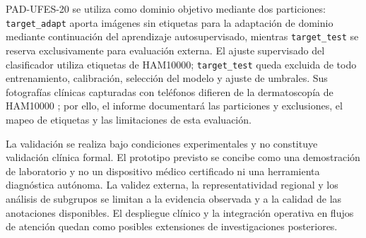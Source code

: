 PAD-UFES-20 se utiliza como dominio objetivo mediante dos particiones: \texttt{target\_adapt} aporta imágenes sin etiquetas para la adaptación de dominio mediante continuación del aprendizaje autosupervisado, mientras \texttt{target\_test} se reserva exclusivamente para evaluación externa. El ajuste supervisado del clasificador utiliza etiquetas de HAM10000; \texttt{target\_test} queda excluida de todo entrenamiento, calibración, selección del modelo y ajuste de umbrales. Sus fotografías clínicas capturadas con teléfonos difieren de la dermatoscopía de HAM10000 \parencite{pacheco2020padufes}; por ello, el informe documentará las particiones y exclusiones, el mapeo de etiquetas y las limitaciones de esta evaluación.

La validación se realiza bajo condiciones experimentales y no constituye validación clínica formal. El prototipo previsto se concibe como una demostración de laboratorio y no un dispositivo médico certificado ni una herramienta diagnóstica autónoma. La validez externa, la representatividad regional y los análisis de subgrupos se limitan a la evidencia observada y a la calidad de las anotaciones disponibles. El despliegue clínico y la integración operativa en flujos de atención quedan como posibles extensiones de investigaciones posteriores.


